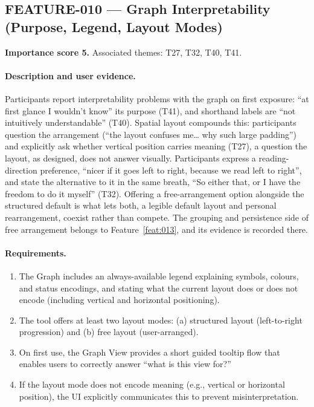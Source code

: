 \subsection{FEATURE-010 --- Graph Interpretability (Purpose, Legend, Layout Modes)}
\label{feat:010}
\textbf{Importance score 5.} Associated themes: T27, T32, T40, T41.

\paragraph{Description and user evidence.}
Participants report interpretability problems with the graph on first exposure: \enquote{at first glance I wouldn't know} its purpose (T41), and shorthand labels are \enquote{not intuitively understandable} (T40). Spatial layout compounds this: participants question the arrangement (\enquote{the layout confuses me… why such large padding}) and explicitly ask whether vertical position carries meaning (T27), a question the layout, as designed, does not answer visually. Participants express a reading-direction preference, \enquote{nicer if it goes left to right, because we read left to right}, and state the alternative to it in the same breath, \enquote{So either that, or I have the freedom to do it myself} (T32). Offering a free-arrangement option alongside the structured default is what lets both, a legible default layout and personal rearrangement, coexist rather than compete. The grouping and persistence side of free arrangement belongs to Feature~\ref{feat:013}, and its evidence is recorded there.

\paragraph{Requirements.}
\begin{enumerate}
    \item The Graph includes an always-available legend explaining symbols, colours, and status encodings, and stating what the current layout does or does not encode (including vertical and horizontal positioning).
    \item The tool offers at least two layout modes: (a) structured layout (left-to-right progression) and (b) free layout (user-arranged).
    \item On first use, the Graph View provides a short guided tooltip flow that enables users to correctly answer \enquote{what is this view for?}
    \item If the layout mode does not encode meaning (e.g., vertical or horizontal position), the UI explicitly communicates this to prevent misinterpretation.
\end{enumerate}



